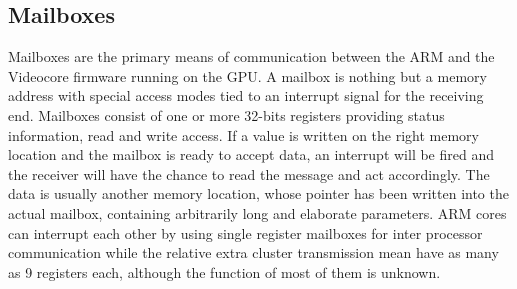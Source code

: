 \documentclass[12pt,a4paper,openright,twoside]{report}
\begin{document}
\subsection{Mailboxes}
Mailboxes are the primary means of communication between the ARM and the 
Videocore firmware running on the GPU. A mailbox is nothing but a memory address
with special access modes tied to an interrupt signal for the receiving end.
Mailboxes consist of one or more 32-bits registers providing status information, read
and write access. If a value is written on the right memory location and the
mailbox is ready to accept data, an interrupt will be fired and the receiver
will have the chance to read the message and act accordingly. The data is 
usually another memory location, whose pointer has been written into the 
actual mailbox, containing arbitrarily long and elaborate parameters.
ARM cores can interrupt each other by using single register mailboxes for inter
processor communication while the relative extra cluster transmission mean have
as many as 9 registers each, although the function of most of them is unknown.
\end{document}
